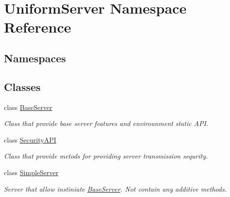 \hypertarget{namespace_uniform_server}{}\section{Uniform\+Server Namespace Reference}
\label{namespace_uniform_server}
\subsection*{Namespaces}
\begin{DoxyCompactItemize}
\end{DoxyCompactItemize}
\subsection*{Classes}
\begin{DoxyCompactItemize}
\item 
class \mbox{\hyperlink{class_uniform_server_1_1_base_server}{Base\+Server}}
\begin{DoxyCompactList}\small\item\em Class that provide base server features and envirounment static A\+PI. \end{DoxyCompactList}\item 
class \mbox{\hyperlink{class_uniform_server_1_1_security_a_p_i}{Security\+A\+PI}}
\begin{DoxyCompactList}\small\item\em Class that provide metods for providing server transmission sequrity. \end{DoxyCompactList}\item 
class \mbox{\hyperlink{class_uniform_server_1_1_simple_server}{Simple\+Server}}
\begin{DoxyCompactList}\small\item\em Server that allow instiniate \mbox{\hyperlink{class_uniform_server_1_1_base_server}{Base\+Server}}. Not contain any additive methods. \end{DoxyCompactList}\end{DoxyCompactItemize}
